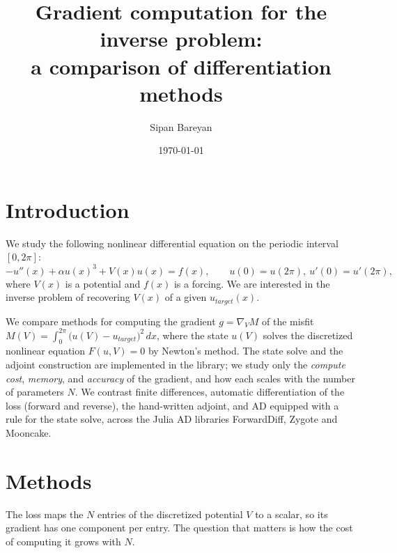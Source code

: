 \documentclass[11pt,a4paper]{article}
\title{Gradient computation for the inverse problem:\\
       a comparison of differentiation methods}
\author{Sipan Bareyan}
\date{\today}
\begin{document}
\maketitle

\section{Introduction}
\noindent
We study the following nonlinear differential equation on the periodic interval $[0,2\pi]$:
\begin{equation}
  -u''(x) + \alpha u(x)^3 + V(x) u(x) = f(x), \qquad u(0)=u(2\pi),\ u'(0)=u'(2\pi),
  \label{eq:nonlinear}
\end{equation}
where $V(x)$ is a potential and $f(x)$ is a forcing. We are interested in the inverse problem of recovering
$V(x)$ of a given $u_{target}(x)$. 

We compare methods for computing the gradient $g=\nabla_V M$ of the misfit
\(M(V)=\int_0^{2\pi}\bigl(u(V)-u_{target}\bigr)^2\,dx\), where the state $u(V)$ solves
the discretized nonlinear equation $F(u,V)=0$ by Newton's method. The state
solve and the adjoint construction are implemented in the library; we study only
the \emph{compute cost}, \emph{memory}, and \emph{accuracy} of the gradient, and
how each scales with the number of parameters $N$. We contrast finite differences,
automatic differentiation of the loss (forward and reverse), the hand-written
adjoint, and AD equipped with a rule for the state solve, across the Julia AD
libraries ForwardDiff, Zygote and Mooncake.

\section{Methods}
\label{sec:methods}

The loss maps the $N$ entries of the discretized potential $V$ to a scalar, so its
gradient has one component per entry. The question that matters is how the cost of
computing it grows with $N$.
\end{document}
